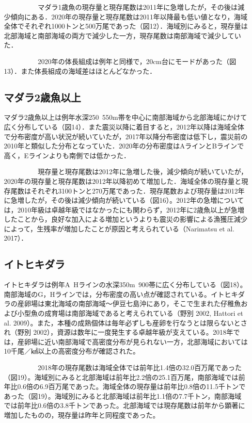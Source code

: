 \documentclass[11pt]{article} %
\begin{document}
\begin{linenumbers}
\ \ \ \ \ \ \ \ \ \ 
マダラ1歳魚の現存量と現存尾数は2011年に急増したが，その後は減少傾向にある．2020年の現存量と現存尾数は2011年以降最も低い値となり，海域全体でそれぞれ1000トンと500万尾であった（図12）．海域別にみると，現存量は北部海域と南部海域の両方で減少した一方，現存尾数は南部海域で減少していた．

\ \ \ \ \ \ \ \ \ \ 
2020年の体長組成は例年と同様で，20cm台にモードがあった（図13）．また体長組成の海域差はほとんどなかった．

\subsection{マダラ2歳魚以上}
マダラ2歳魚以上は例年水深250~550m帯を中心に南部海域から北部海域にかけて広く分布している（図14）．また震災以降に着目すると，2012年以降は海域全体で分布密度が高い状況が続いていたが，2017年以降分布密度は低下し，震災前の2010年と類似した分布となっていた．2020年の分布密度はAラインとBラインで高く，Eラインよりも南側では低かった．

\ \ \ \ \ \ \ \ \ \ 
現存量と現存尾数は2012年に急増した後，減少傾向が続いていたが，2020年の現存量と現存尾数は2012年以降初めて増加した．海域全体の現存量と現存尾数はそれぞれ3100トンと270万尾であった．現存尾数および現存量は2012年に急増したが，その後は減少傾向が続いている（図16）。2012年の急増については，2010年級は卓越年級ではなかったにも関わらず，2012年に2歳魚以上が急増したことから，良好な加入による増加というよりも震災の影響による漁獲圧減少によって，生残率が増加したことが原因と考えられている（Narimatsu et al. 2017）．

\subsection{イトヒキダラ}
イトヒキダラは例年A~Hラインの水深350m~900帯に広く分布している（図18）。南部海域のG，Hラインでは，分布密度の高い点が確認されている。イトヒキダラの産卵場は東北海域の南部海域～伊豆七島沖にあり，そこで生まれた仔稚魚および小型魚の成育場は南部海域であると考えられている（野別 2002, Hattori et al. 2009）。また，本種の成熟個体は毎年必ずしも産卵を行なうとは限らないとされ（野別 2002），資源は数年に一度発生する卓越年級が支えている。2018年では，産卵場に近い南部海域で高密度分布が見られない一方，北部海域においては10千尾／㎢以上の高密度分布が確認された。

\ \ \ \ \ \ \ \ \ \ 
2018年の現存尾数は海域全体では前年比1.4倍の32.0百万尾であった（図19）。海域別にみると北部海域は前年比2.2倍の25.1百万尾，南部海域では前年比0.6倍の6.9百万尾であった。海域全体の現存量は前年比0.8倍の11.5千トンであった（図19）。海域別にみると北部海域は前年比1.1倍の7.7千トン，南部海域では前年比0.6倍の3.8千トンであった。北部海域では現存尾数は前年から顕著に増加したものの，現存量は昨年と同程度であった。


\end{linenumbers}
\end{document}
